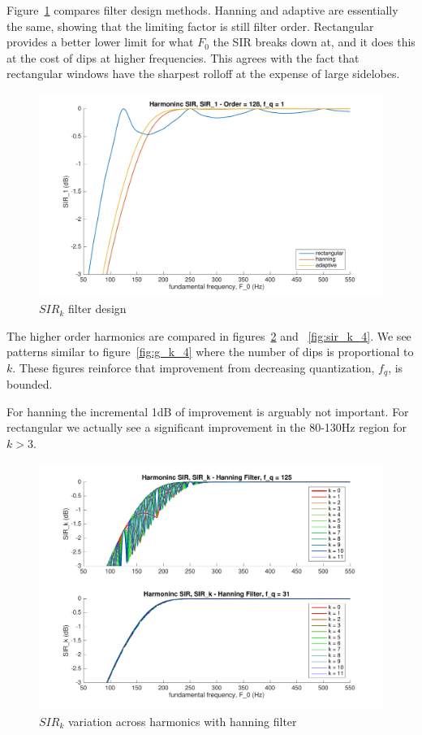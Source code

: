 \documentclass [11pt, proquest] {uwthesis}[2015/03/03]
\begin{document}
Figure~\ref{fig:sir_k_2} compares filter design methods.  Hanning and adaptive are essentially the same, showing that the limiting factor is still filter order.  Rectangular provides a better lower limit for what $F_0$ the SIR breaks down at, and it does this at the cost of dips at higher frequencies.  This agrees with the fact that rectangular windows have the sharpest rolloff at the expense of large sidelobes.

\begin{figure}[!ht]
  \centering
    \includegraphics[width=1\textwidth]{sir_k_2}
    \caption{$SIR_k$ filter design}\label{fig:sir_k_2}
\end{figure}

The higher order harmonics are compared in figures~\ref{fig:sir_k_3} and ~\ref{fig:sir_k_4}.  We see patterns similar to figure~\ref{fig:g_k_4} where the number of dips is proportional to $k$.  These figures reinforce that improvement from decreasing quantization, $f_q$, is bounded.

For hanning the incremental 1dB of improvement is arguably not important.  For rectangular we actually see a significant improvement in the 80-130Hz region for $k > 3$.

\begin{figure}[!ht]
  \centering
    \includegraphics[width=1\textwidth]{sir_k_3}
    \caption{$SIR_k$ variation across harmonics with hanning filter}\label{fig:sir_k_3}
\end{figure}
\end{document}
